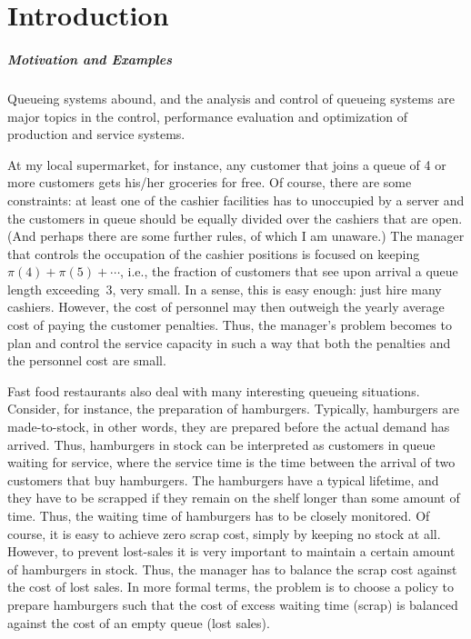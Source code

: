 \chapter*{Introduction}\label{sec:introduction}

\paragraph{Motivation and Examples}
Queueing systems abound, and the analysis and control of queueing
systems are major topics in the control, performance evaluation and
optimization of production and service systems. 


At my local supermarket, for instance, any customer that joins a queue
of 4 or more customers gets his/her groceries for free. Of course, there
are some constraints: at least one of the cashier facilities has to
unoccupied by a server and the customers in queue should be equally
divided over the cashiers that are open. (And perhaps there are some
further rules, of which I am unaware.) The manager that controls the
occupation of the cashier positions is focused on keeping
$\pi(4)+\pi(5)+\cdots$, i.e., the fraction of customers that see upon
arrival a queue length exceeding~3, very small. In a sense,
this is easy enough: just hire many cashiers. However, the cost of
personnel may then outweigh the yearly average cost of paying the
customer penalties. Thus, the manager's problem becomes to plan and
control the service capacity  in such a way that both
the penalties and the personnel cost are small.

Fast food restaurants also deal with many interesting queueing
situations. Consider, for instance, the preparation of
hamburgers. Typically, hamburgers are made-to-stock, in other words,
they are prepared before the actual demand has arrived. Thus, hamburgers
in stock can be interpreted as customers in queue waiting for service,
where the service time is the time between the arrival of two
customers that buy hamburgers. The hamburgers have a typical lifetime,
and they have to be scrapped if they remain on the shelf longer than
some amount of time. Thus, the waiting time of hamburgers has to be
closely monitored. Of course, it is easy to achieve zero scrap cost,
simply by keeping no stock at all.  However, to prevent lost-sales it
is very important to maintain a certain amount of hamburgers in
stock. Thus, the manager has to balance the scrap cost against the
cost of lost sales. In more formal terms, the problem is to choose a
policy to prepare hamburgers such that the cost of excess waiting time
(scrap) is balanced against the cost of an empty queue (lost sales).

